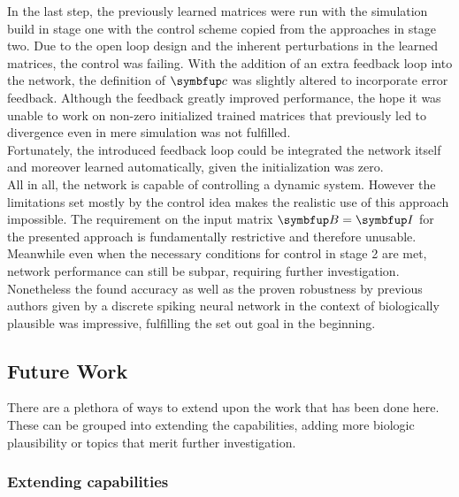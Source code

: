 In the last step, the previously learned matrices were run with the simulation build in stage one with the control scheme copied from the approaches in stage two. Due to the open loop design and the inherent perturbations in the learned matrices, the control was failing. With the addition of an extra feedback loop into the network, the definition of $\bmu{c}$ was slightly altered to incorporate error feedback.
Although the feedback greatly improved performance, the hope it was unable to work on non-zero initialized trained matrices that previously led to divergence even in mere simulation was not fulfilled.\\
Fortunately, the introduced feedback loop could be integrated the network itself and moreover learned automatically, given the initialization was zero.\\

All in all, the network is capable of controlling a dynamic system. However the limitations set mostly by the control idea makes the realistic use of this approach impossible. The requirement on the input matrix $\bmu{B} = \bmu{I}$ for the presented approach is fundamentally restrictive and therefore unusable. Meanwhile even when the necessary conditions for control in stage 2 are met, network performance can still be subpar, requiring further investigation.\\

Nonetheless the found accuracy as well as the proven robustness by previous authors given by a discrete spiking neural network in the context of biologically plausible was impressive, fulfilling the set out goal in the beginning.\\

\subsection{Future Work}

There are a plethora of ways to extend upon the work that has been done here. These can be grouped into extending the capabilities, adding more biologic plausibility or topics that merit further investigation.
\subsubsection{Extending capabilities}
